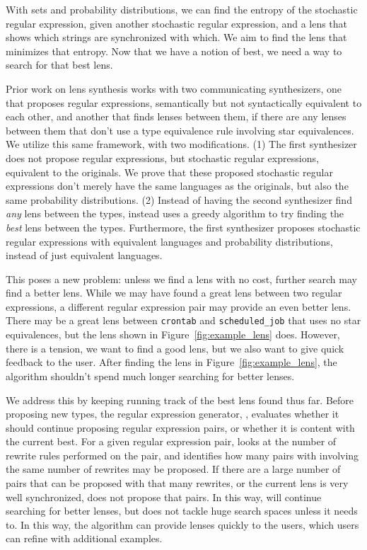 \documentclass[acmsmall,screen,anonymous]{acmart}
\begin{document}
With sets and probability distributions, we can find the entropy of the
stochastic regular expression, given another stochastic regular expression, and
a lens that shows which strings are synchronized with which. We aim to find the
lens that minimizes that entropy.  Now that we have a notion of best, we need a
way to search for that best lens.

Prior work on lens synthesis works with two communicating synthesizers, one that
proposes regular expressions, semantically but not syntactically equivalent to
each other, and another that finds lenses between them, if there are any lenses
between them that don't use a type equivalence rule involving star equivalences.
We utilize this same framework, with two modifications. (1) The first
synthesizer does not propose regular expressions, but stochastic regular
expressions, equivalent to the originals. We prove that these proposed
stochastic regular expressions don't merely have the same languages as the
originals, but also the same probability distributions. (2) Instead of having
the second synthesizer find \emph{any} lens between the types, \GreedySynth
instead uses a greedy algorithm to try finding the \emph{best} lens between the
types. Furthermore, the first synthesizer proposes stochastic regular
expressions with equivalent languages and probability distributions, instead of
just equivalent languages.

This poses a new problem: unless we find a lens with no cost, further search may
find a better lens. While we may have found a great lens between two regular
expressions, a different regular expression pair may provide an even better
lens. There may be a great lens between \lstinline{crontab} and
\lstinline{scheduled_job} that uses no star equivalences, but the lens shown in
Figure~\ref{fig:example_lens} does. However, there is a tension, we want to find
a good lens, but we also want to give quick feedback to the user. After finding
the lens in Figure~\ref{fig:example_lens}, the algorithm shouldn't spend much
longer searching for better lenses.

We address this by keeping running track of the best lens found thus far. Before
proposing new types, the regular expression generator, \RXSearch, evaluates
whether it should continue proposing regular expression pairs, or whether it is
content with the current best. For a given regular expression pair, \RXSearch
looks at the number of rewrite rules performed on the pair, and identifies how
many pairs with involving the same number of rewrites may be proposed. If there
are a large number of pairs that can be proposed with that many rewrites, or the
current lens is very well synchronized, \RXSearch does not propose that pairs.
In this way, \RXSearch will continue searching for better lenses, but does not
tackle huge search spaces unless it needs to. In this way, the algorithm can
provide lenses quickly to the users, which users can refine with additional
examples.
\end{document}
